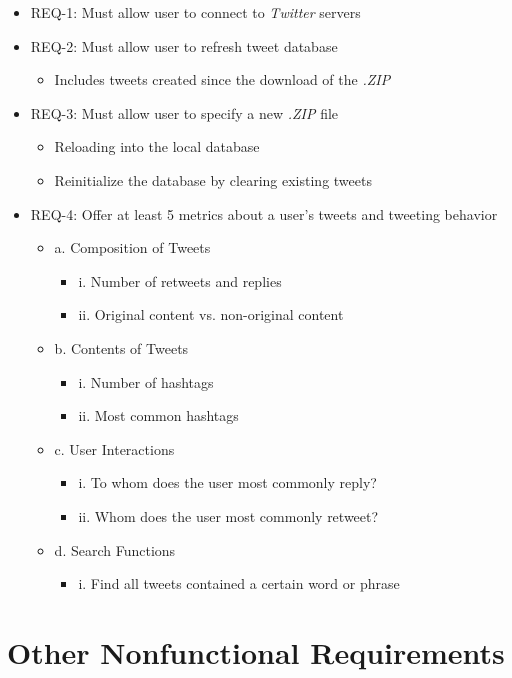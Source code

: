 \documentclass[a4paper, 12pt]{article}
\begin{document}
\begin{itemize}
\item REQ-1: Must allow user to connect to \textit{Twitter} servers
\item REQ-2: Must allow user to refresh tweet database
\begin{itemize}
\item Includes tweets created since the download of the \textit{.ZIP}
\end{itemize}
\item REQ-3: Must allow user to specify a new \textit{.ZIP} file
\begin{itemize}
\item Reloading into the local database
\item Reinitialize the database by clearing existing tweets
\end{itemize}
\item REQ-4: Offer at least 5 metrics about a user's tweets and tweeting behavior
\begin {itemize} 
\item a. Composition of Tweets
\begin{itemize}
\item i. Number of retweets and replies
\item ii. Original content vs. non-original content
\end{itemize}
\item b. Contents of Tweets
\begin{itemize}
\item i. Number of hashtags
\item ii. Most common hashtags
\end{itemize}
\item c. User Interactions
\begin{itemize}
\item i. To whom does the user most commonly reply?
\item ii. Whom does the user most commonly retweet?
\end{itemize}
\item d. Search Functions
\begin{itemize}
\item i. Find all tweets contained a certain word or phrase
\end{itemize}
\end{itemize}
\end{itemize}

\section{Other Nonfunctional Requirements} \label{sec:nonfunc}
\end{document}
